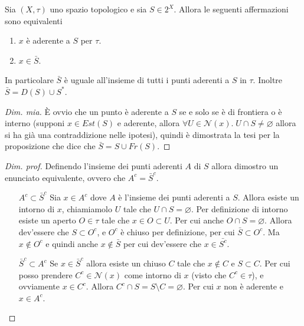 \begin{theorem}
	\label{prop:aderent_points_are_in_closure}
	Sia $(X, \tau)$ uno spazio topologico e sia $S \in 2^X$. Allora le seguenti affermazioni sono equivalenti
	\begin{enumerate}
		\item $x$ è aderente a $S$ per $\tau$.
		\item $x \in \bar{S}$. 
	\end{enumerate}
	In particolare $\bar{S}$ è uguale all'insieme di tutti i punti aderenti a $S$ in $\tau$. Inoltre $\bar{S} = D(S) \cup S^*$.
\end{theorem}
\begin{proof}[Dim. mia]
	 È ovvio che un punto è aderente a $S$ se e solo se è di frontiera o è interno (supponi $x \in Est(S)$ e aderente, allora $\forall U \in \mathcal{N}(x).\; U \cap S \neq \varnothing$ allora si ha già una contraddizione nelle ipotesi), quindi è dimostrata la tesi per la proposizione che dice che $\bar{S} = S \cup Fr(S)$.
\end{proof}
\begin{proof}[Dim. prof]
	Definendo l'insieme dei punti aderenti $A$ di $S$ allora dimostro un enunciato equivalente, ovvero che $A^c = \bar{S}^c$.
	\begin{enumerate}
		\item[$A^c \subset \bar{S}^c$] Sia $x\in A^c$ dove $A$ è l'insieme dei punti aderenti a $S$. Allora esiste un intorno di $x$, chiamiamolo $U$ tale che $U \cap S = \varnothing$. Per definizione di intorno esiste un aperto $O \in \tau$ tale che $x \in O \subset U$. Per cui anche $O \cap S = \varnothing$. Allora dev'essere che $S \subset O^c$,  e $O^c$ è chiuso per definizione, per cui $\bar{S} \subset O^c$. Ma $x \notin O^c$ e quindi anche $x \notin \bar{S}$ per cui dev'essere che $x \in \bar{S^c}$.
		\item[$\bar{S}^c\subset A^c $] Se $x \in \bar{S}^c$ allora esiste un chiuso $C$ tale che $x \notin C$ e $S \subset C$. Per cui posso prendere $C^c \in \mathcal{N}(x)$ come intorno di $x$ (visto che $C^c \in \tau$), e ovviamente $x \in C^c$. Allora $C^c \cap S = S \setminus C = \varnothing$. Per cui $x$ non è aderente e $x \in A^c$.
	\end{enumerate}
\end{proof}

